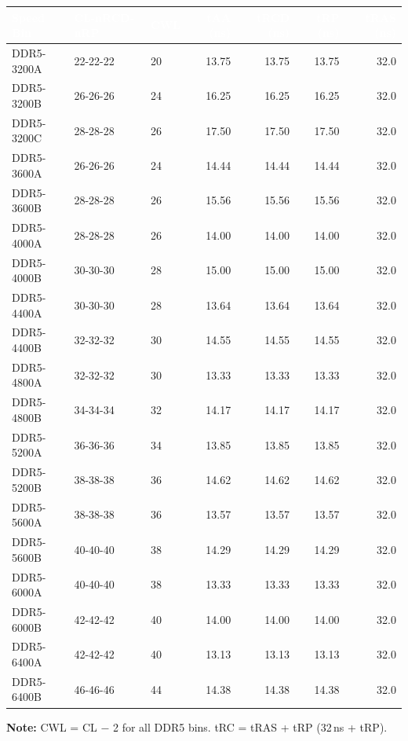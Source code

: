 \documentclass[10pt,a4paper,twoside]{article}
\newcommand{\thd}[1]{\cellcolor{navyblue}\textcolor{white}{\textbf{#1}}}
\newcommand{\trow}{\rowcolor{lightgray}}
\newcommand{\talt}{\rowcolor{skyblue!30}}
\begin{document}
\begin{center}
\begin{tabularx}{\linewidth}{@{} l l l r r r r @{}}
\toprule
\thd{Speed Bin} & \thd{CL-nRCD-nRP} & \thd{CWL} &
\thd{tAA (ns)} & \thd{tRCD (ns)} & \thd{tRP (ns)} & \thd{tRAS (ns)} \\
\midrule
\trow DDR5-3200A & 22-22-22 & 20 & 13.75 & 13.75 & 13.75 & 32.0 \\
\talt DDR5-3200B & 26-26-26 & 24 & 16.25 & 16.25 & 16.25 & 32.0 \\
\trow DDR5-3200C & 28-28-28 & 26 & 17.50 & 17.50 & 17.50 & 32.0 \\
\midrule
\talt DDR5-3600A & 26-26-26 & 24 & 14.44 & 14.44 & 14.44 & 32.0 \\
\trow DDR5-3600B & 28-28-28 & 26 & 15.56 & 15.56 & 15.56 & 32.0 \\
\midrule
\talt DDR5-4000A & 28-28-28 & 26 & 14.00 & 14.00 & 14.00 & 32.0 \\
\trow DDR5-4000B & 30-30-30 & 28 & 15.00 & 15.00 & 15.00 & 32.0 \\
\midrule
\talt DDR5-4400A & 30-30-30 & 28 & 13.64 & 13.64 & 13.64 & 32.0 \\
\trow DDR5-4400B & 32-32-32 & 30 & 14.55 & 14.55 & 14.55 & 32.0 \\
\midrule
\talt DDR5-4800A & 32-32-32 & 30 & 13.33 & 13.33 & 13.33 & 32.0 \\
\trow DDR5-4800B & 34-34-34 & 32 & 14.17 & 14.17 & 14.17 & 32.0 \\
\midrule
\talt DDR5-5200A & 36-36-36 & 34 & 13.85 & 13.85 & 13.85 & 32.0 \\
\trow DDR5-5200B & 38-38-38 & 36 & 14.62 & 14.62 & 14.62 & 32.0 \\
\midrule
\talt DDR5-5600A & 38-38-38 & 36 & 13.57 & 13.57 & 13.57 & 32.0 \\
\trow DDR5-5600B & 40-40-40 & 38 & 14.29 & 14.29 & 14.29 & 32.0 \\
\midrule
\talt DDR5-6000A & 40-40-40 & 38 & 13.33 & 13.33 & 13.33 & 32.0 \\
\trow DDR5-6000B & 42-42-42 & 40 & 14.00 & 14.00 & 14.00 & 32.0 \\
\midrule
\talt DDR5-6400A & 42-42-42 & 40 & 13.13 & 13.13 & 13.13 & 32.0 \\
\trow DDR5-6400B & 46-46-46 & 44 & 14.38 & 14.38 & 14.38 & 32.0 \\
\bottomrule
\end{tabularx}
\end{center}

\textbf{Note:} CWL = CL $-$ 2 for all DDR5 bins. tRC = tRAS + tRP (32\,ns + tRP).
\end{document}

